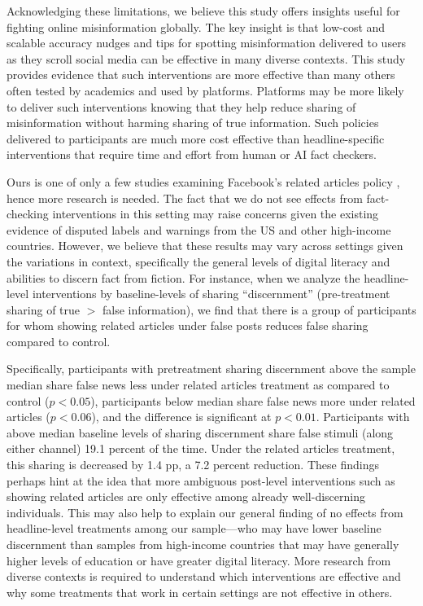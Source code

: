 \documentclass[letterpaper, 12pt, parskip=full,DIV=10]{scrartcl}
\begin{document}
Acknowledging these limitations, we believe this study offers insights useful for fighting online misinformation globally. The key insight is that low-cost and scalable accuracy nudges and tips for spotting misinformation delivered to users as they scroll social media can be effective in many diverse contexts. This study provides evidence that such interventions are more effective than many others often tested by academics and used by platforms. Platforms may be more likely to deliver such interventions knowing that they help reduce sharing of misinformation without harming sharing of true information. Such policies delivered to participants are much more cost effective than headline-specific interventions that require time and effort from human or AI fact checkers.

Ours is one of only a few studies examining Facebook's related articles policy \citep[see also][]{bode2015related}, hence more research is needed. The fact that we do not see effects from fact-checking interventions in this setting may raise concerns given the existing evidence of disputed labels and warnings from the US and other high-income countries. However, we believe that these results may vary across settings given the variations in context, specifically the general levels of digital literacy and abilities to discern fact from fiction. For instance, when we analyze the headline-level interventions by baseline-levels of sharing ``discernment'' (pre-treatment sharing of true $>$ false information), we find that there is a group of participants for whom showing related articles under false posts reduces false sharing compared to control. 

Specifically, participants with pretreatment sharing discernment above the sample median share false news less under related articles treatment as compared to control ($p < 0.05$), participants below median share false news more under related articles ($p < 0.06$), and the difference is significant at $p < 0.01$. Participants with above median baseline levels of sharing discernment share false stimuli (along either channel) 19.1 percent of the time. Under the related articles treatment, this sharing is decreased by 1.4 pp, a 7.2 percent reduction. These findings perhaps hint at the idea that more ambiguous post-level interventions such as showing related articles are only effective among already well-discerning individuals. This may also help to explain our general finding of no effects from headline-level treatments among our sample---who may have lower baseline discernment than samples from high-income countries that may have generally higher levels of education or have greater digital literacy. More research from diverse contexts is required to understand which interventions are effective and why some treatments that work in certain settings are not effective in others.
\end{document}
